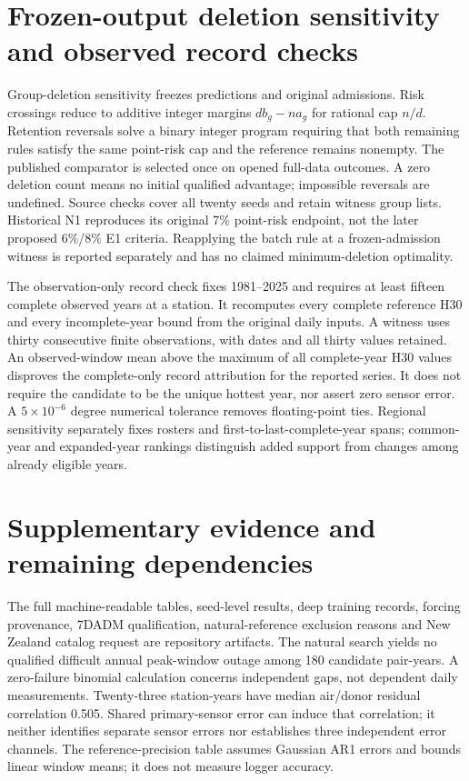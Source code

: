 \documentclass[draft]{agujournal2025}
\begin{document}
\section{Frozen-output deletion sensitivity and observed record checks}
Group-deletion sensitivity freezes predictions and original admissions. Risk crossings reduce to additive integer margins $d b_g-n a_g$ for rational cap $n/d$. Retention reversals solve a binary integer program requiring that both remaining rules satisfy the same point-risk cap and the reference remains nonempty. The published comparator is selected once on opened full-data outcomes. A zero deletion count means no initial qualified advantage; impossible reversals are undefined. Source checks cover all twenty seeds and retain witness group lists. Historical N1 reproduces its original 7\% point-risk endpoint, not the later proposed 6\%/8\% E1 criteria. Reapplying the batch rule at a frozen-admission witness is reported separately and has no claimed minimum-deletion optimality.

The observation-only record check fixes 1981--2025 and requires at least fifteen complete observed years at a station. It recomputes every complete reference H30 and every incomplete-year bound from the original daily inputs. A witness uses thirty consecutive finite observations, with dates and all thirty values retained. An observed-window mean above the maximum of all complete-year H30 values disproves the complete-only record attribution for the reported series. It does not require the candidate to be the unique hottest year, nor assert zero sensor error. A $5\times10^{-6}$ degree numerical tolerance removes floating-point ties. Regional sensitivity separately fixes rosters and first-to-last-complete-year spans; common-year and expanded-year rankings distinguish added support from changes among already eligible years.

\section{Supplementary evidence and remaining dependencies}
The full machine-readable tables, seed-level results, deep training records, forcing provenance, 7DADM qualification, natural-reference exclusion reasons and New Zealand catalog request are repository artifacts. The natural search yields no qualified difficult annual peak-window outage among 180 candidate pair-years. A zero-failure binomial calculation concerns independent gaps, not dependent daily measurements. Twenty-three station-years have median air/donor residual correlation 0.505. Shared primary-sensor error can induce that correlation; it neither identifies separate sensor errors nor establishes three independent error channels. The reference-precision table assumes Gaussian AR1 errors and bounds linear window means; it does not measure logger accuracy.
\end{document}
